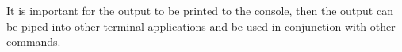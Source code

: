 It is important for the output to be printed to the console, then the
output can be piped into other terminal applications and be used in conjunction
with other commands.



